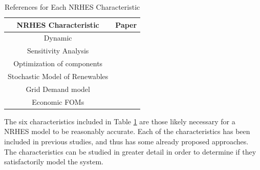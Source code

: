 \begin{table}[h!]
\centering
\caption{References for Each NRHES Characteristic}
\begin{tabular}{ ||c | c|| }
 \hline
 NRHES Characteristic & Paper \\ [0.5ex]
 \hline \hline
 Dynamic & \cite{Garcia2013, Du2014, Kazimi, Garcia2016}\\
 \hline
 Sensitivity Analysis & \cite{Shropshire2011, Rehman2010, Adaramola2014, Chen2016}\\
 \hline
 Optimization of components & \cite{Chen2016,Ozcan2016, Forsberg2009,Garcia2015,Aumeier2011}\\
 \hline
 Stochastic Model of Renewables & \cite{Rabiti2015, Garcia2016,Locatelli2015}\\
 \hline
 Grid Demand model & \cite{Forsberg2013, Garcia2016,Garcia2013,Ruth2014,Chen2016}\\
 \hline
  Economic FOMs & \cite{Garcia2016,Chen2016,Rabiti2015,Epiney2016,Bragg-Sitton2014}\\
 \hline
\end{tabular}
\label{table:1}
\end{table}

The six characteristics included in Table \ref{table:1} are those likely necessary for a NRHES model to be reasonably accurate.  Each of the characteristics has been included in previous studies, and thus has some already proposed approaches.  The characteristics can be studied in greater detail in order to determine if they satisfactorily model the system.
